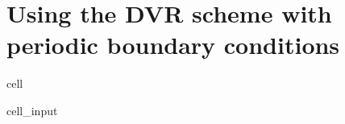 \documentclass[letterpaper,10pt,english]{jupyterBook}
\begin{document}
\section{Using the DVR scheme with periodic boundary conditions}
\label{\detokenize{Section6:using-the-dvr-scheme-with-periodic-boundary-conditions}}
\begin{sphinxuseclass}{cell}\begin{sphinxVerbatimInput}

\begin{sphinxuseclass}{cell_input}
\begin{sphinxVerbatim}[commandchars=\\\{\}]
  
  

 
 

    
\end{sphinxVerbatim}

\end{sphinxuseclass}\end{sphinxVerbatimInput}

\end{sphinxuseclass}
\end{document}
